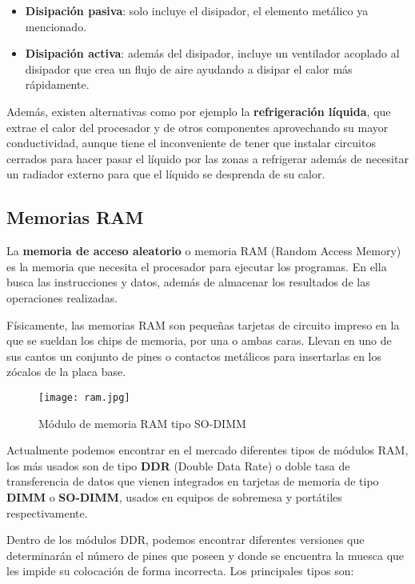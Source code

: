 \begin{itemize}
    \item \textbf{Disipación pasiva}: solo incluye el disipador, el elemento metálico ya mencionado.
    \item \textbf{Disipación activa}: además del disipador, incluye un ventilador acoplado al disipador que crea un flujo de aire ayudando a disipar el calor más rápidamente.
\end{itemize}

Además, existen alternativas como por ejemplo la \textbf{refrigeración líquida}, que extrae el calor del procesador y de otros componentes aprovechando su mayor conductividad, aunque tiene el inconveniente de tener que instalar circuitos cerrados para hacer pasar el líquido por las zonas a refrigerar además de necesitar un radiador externo para que el líquido se desprenda de su calor.

\subsection{Memorias RAM}
La \textbf{memoria de acceso aleatorio} o memoria RAM (Random Access Memory) es la memoria que necesita el procesador para ejecutar los programas. En ella busca las instrucciones y datos, además de almacenar los resultados de las operaciones realizadas.

Físicamente, las memorias RAM son pequeñas tarjetas de circuito impreso en la que se sueldan los chips de memoria, por una o ambas caras. Llevan en uno de sus cantos un conjunto de pines o contactos metálicos para insertarlas en los zócalos de la placa base.

\begin{figure}[ht]
    \centering
    \texttt{[image: ram.jpg]}
    \caption{Módulo de memoria RAM tipo SO-DIMM}
\end{figure}

Actualmente podemos encontrar en el mercado diferentes tipos de módulos RAM, los más usados son de tipo \textbf{DDR} (Double Data Rate) o doble tasa de transferencia de datos que vienen integrados en tarjetas de memoria de tipo \textbf{DIMM} o \textbf{SO-DIMM}, usados en equipos de sobremesa y portátiles respectivamente.

Dentro de los módulos DDR, podemos encontrar diferentes versiones que determinarán el número de pines que poseen y donde se encuentra la muesca que les impide su colocación de forma incorrecta. Los principales tipos son:

